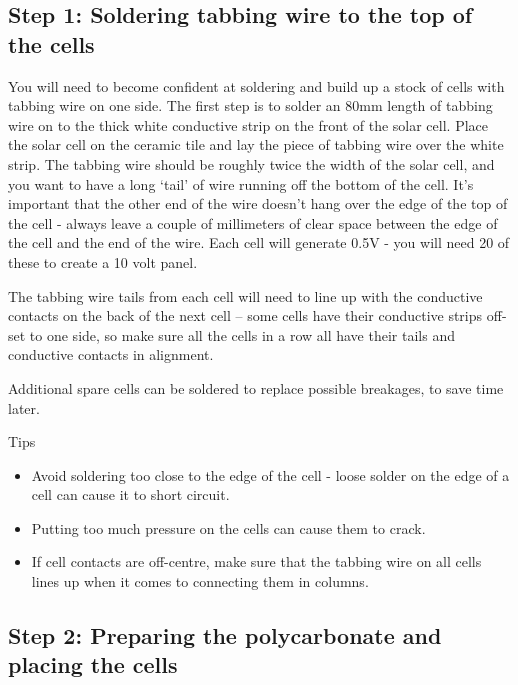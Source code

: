 \documentclass{article}
\theoremstyle{definition}
\theoremstyle{definition}
\theoremstyle{remark}
\begin{document}
  \subsection{Step 1: Soldering tabbing wire to the top of the cells} %
  \label{sub:step_1_soldering_tabbing_wire_to_the_top_of_the_cells}

    You will need to become confident at soldering and build up a stock of cells with tabbing wire on one side. The first step is to solder an 80mm length of tabbing wire on to the thick white conductive strip on the front of the solar cell. Place the solar cell on the ceramic tile and lay the piece of tabbing wire over the white strip. The tabbing wire should be roughly twice the width of the solar cell, and you want to have a long ‘tail’ of wire running off the bottom of the cell. It’s important that the other end of the wire doesn’t hang over the edge of the top of the cell - always leave a couple of millimeters of clear space between the edge of the cell and the end of the wire. Each cell will generate 0.5V - you will need 20 of these to create a 10 volt panel.


    The tabbing wire tails from each cell will need to line up with the conductive contacts on the back of the next cell – some cells have their conductive strips off-set to one side, so make sure all the cells in a row all have their tails and conductive contacts in alignment.

    Additional spare cells can be soldered to replace possible breakages, to save time later.

    Tips

    \begin{itemize}
      \item Avoid soldering too close to the edge of the cell - loose solder on the edge of a cell can cause it to short circuit. 
      \item Putting too much pressure on the cells can cause them to crack. 
      \item If cell contacts are off-centre, make sure that the tabbing wire on all cells lines up when it comes to connecting them in columns.
    \end{itemize}
  

  \subsection{Step 2: Preparing the polycarbonate and placing the cells} %
  \label{sub:step_2_preparing_the_polycarbonate_and_placing_the_cells}
\end{document}
